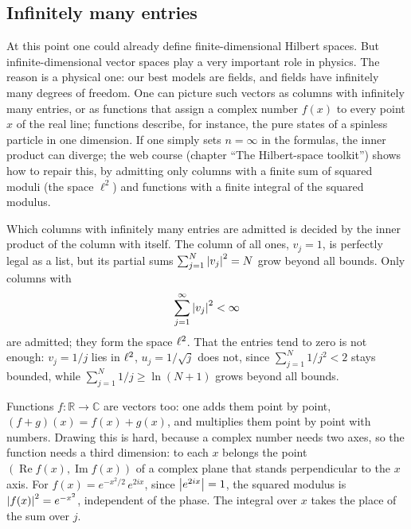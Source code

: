 \subsection{Infinitely many entries}
At this point one could already define finite-dimensional Hilbert spaces. But infinite-dimensional vector spaces play a very important role in physics. The reason is a physical one: our best models are fields, and fields have infinitely many degrees of freedom. One can picture such vectors as columns with infinitely many entries, or as functions that assign a complex number $f(x)$ to every point $x$ of the real line; functions describe, for instance, the pure states of a spinless particle in one dimension. If one simply sets $n=\infty$ in the formulas, the inner product can diverge; the web course (chapter ``The Hilbert-space toolkit'') shows how to repair this, by admitting only columns with a finite sum of squared moduli (the space $\ell^2$) and functions with a finite integral of the squared modulus.

\begin{webonly}
Which columns with infinitely many entries are admitted is decided by the inner product of the column with itself. The column of all ones, $v_j = 1$, is perfectly legal as a list, but its partial sums $\sum_{j=1}^{N} \left\lvert v_j \right\rvert^2 = N$ grow beyond all bounds. Only columns with
\begin{equation*}
	\sum_{j=1}^{\infty} \left\lvert v_j \right\rvert^2 < \infty
\end{equation*}
are admitted; they form the space $\ell^{2}$. That the entries tend to zero is not enough: $v_j = 1/j$ lies in $\ell^{2}$, $u_j = 1/\sqrt{j}$ does not, since $\sum_{j=1}^{N} 1/j^2 < 2$ stays bounded, while $\sum_{j=1}^{N} 1/j \geq \ln(N+1)$ grows beyond all bounds.
\end{webonly}


\begin{webonly}
Functions $f\colon \mathbb{R} \to \mathbb{C}$ are vectors too: one adds them point by point, $(f+g)(x) = f(x) + g(x)$, and multiplies them point by point with numbers. Drawing this is hard, because a complex number needs two axes, so the function needs a third dimension: to each $x$ belongs the point $(\operatorname{Re} f(x), \operatorname{Im} f(x))$ of a complex plane that stands perpendicular to the $x$ axis. For $f(x) = e^{-x^2/2}\, e^{2ix}$, since $\left\lvert e^{2ix} \right\rvert = 1$, the squared modulus is $\left\lvert f(x) \right\rvert^2 = e^{-x^2}$, independent of the phase. The integral over $x$ takes the place of the sum over $j$.
\end{webonly}

